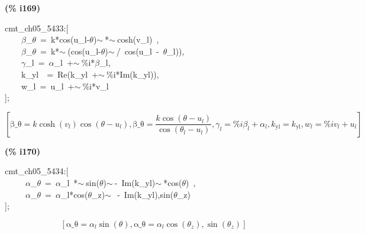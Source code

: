 \documentclass[fleqn]{article}
\begin{document}
\noindent
\begin{minipage}[t]{4.000000em}\color{red}\bfseries
(\% i169)	
\end{minipage}
\begin{minipage}[t]{\textwidth}\color{blue}
cmt\_ch05\_5433:[\\
\ \ \ \ \ensuremath{\beta}\_\ensuremath{\theta}\ =\ k*cos(u\_l-\ensuremath{\theta})\ensuremath{\sim\ }*\ensuremath{\sim\ }cosh(v\_l)\ ,\ \\
\ \ \ \ \ensuremath{\beta}\_\ensuremath{\theta}\ =\ k*\ensuremath{\sim\ }(cos(u\_l-\ensuremath{\theta})\ensuremath{\sim\ }/\ cos(u\_l\ -\ \ensuremath{\theta}\_l)),\\
\ \ \ \ \ensuremath{\gamma}\_l\ =\ \ensuremath{\alpha}\_l\ +\ensuremath{\sim\ }\%i*\ensuremath{\beta}\_l,\\
\ \ \ \ k\_yl\ \ =\ Re(k\_yl\ +\ensuremath{\sim\ }\%i*Im(k\_yl)),\\
\ \ \ \ w\_l\ =\ u\_l\ +\ensuremath{\sim\ }\%i*v\_l\\
];
\end{minipage}
\[\displaystyle \tag{\% o169} 
\operatorname{[}\ensuremath{\mathrm{\beta \_ \theta }}=k \cosh{\left( {v_l}\right) } \cos{\left( \theta -{u_l}\right) }\operatorname{,}\ensuremath{\mathrm{\beta \_ \theta }}=\frac{k \cos{\left( \theta -{u_l}\right) }}{\cos{\left( {{\theta }_l}-{u_l}\right) }}\operatorname{,}{{\gamma }_l}=\% i {{\beta }_l}+{{\alpha }_l}\operatorname{,}{k_{\ensuremath{\mathrm{yl}}}}={k_{\ensuremath{\mathrm{yl}}}}\operatorname{,}{w_l}=\% i {v_l}+{u_l}\operatorname{]}\mbox{}
\]


\noindent
\begin{minipage}[t]{4.000000em}\color{red}\bfseries
(\% i170)	
\end{minipage}
\begin{minipage}[t]{\textwidth}\color{blue}
cmt\_ch05\_5434:[\\
\ \ \ \ \ \ensuremath{\alpha}\_\ensuremath{\theta}\ =\ \ensuremath{\alpha}\_l\ *\ensuremath{\sim\ }sin(\ensuremath{\theta})\ensuremath{\sim\ }-\ Im(k\_yl)\ensuremath{\sim\ }*cos(\ensuremath{\theta})\ ,\\
\ \ \ \ \ \ensuremath{\alpha}\_\ensuremath{\theta}\ =\ \ensuremath{\alpha}\_l*cos(\ensuremath{\theta}\_z)\ensuremath{\sim\ }\ -\ Im(k\_yl),sin(\ensuremath{\theta}\_z)\\
];
\end{minipage}
\[\displaystyle \tag{\% o170} 
\left[ \ensuremath{\mathrm{\alpha \_ \theta }}={{\alpha }_l} \sin{\left( \theta \right) }\operatorname{,}\ensuremath{\mathrm{\alpha \_ \theta }}={{\alpha }_l} \cos{\left( {{\theta }_z}\right) }\operatorname{,}\sin{\left( {{\theta }_z}\right) }\right] \mbox{}
\]
\end{document}

